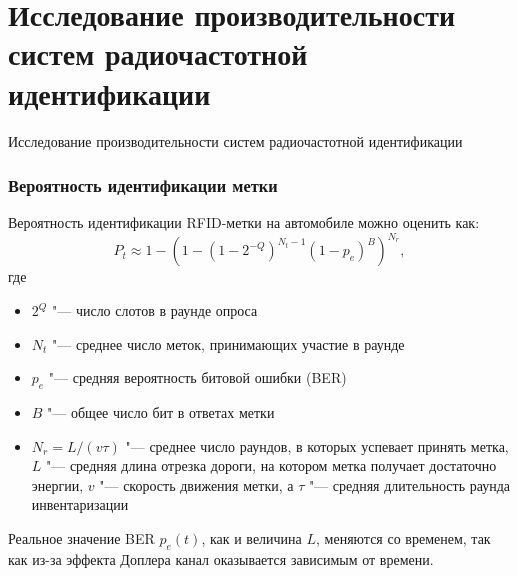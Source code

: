\section{Исследование производительности систем радиочастотной идентификации}
\begin{frame}
    \begin{center}
        \Huge
        Исследование производительности систем радиочастотной идентификации
    \end{center}
\end{frame}


\begin{frame}
    \frametitle{Вероятность идентификации метки}
    Вероятность идентификации RFID-метки на автомобиле можно оценить как:
    \[
        P_t \approx 1 - \left( 1 - (1 - 2^{-Q})^{N_t-1} (1 - p_e)^B \right)^{N_r},
    \]
    где
    \begin{itemize}
        \item $2^Q$ "--- число слотов в раунде опроса
        \item $N_t$ "--- среднее число меток, принимающих участие в раунде
        \item $p_e$ "--- средняя вероятность битовой ошибки (BER)
        \item $B$ "--- общее число бит в ответах метки
        \item $N_r = L / (v \tau)$ "--- среднее число раундов, в которых успевает принять метка, $L$ "--- средняя длина отрезка дороги, на котором метка получает достаточно энергии, $v$ "--- скорость движения метки, а $\tau$ "--- средняя длительность раунда инвентаризации
    \end{itemize}
    Реальное значение BER $p_e(t)$, как и величина $L$, меняются со временем, так как из-за эффекта Доплера канал оказывается зависимым от времени.
\end{frame}


